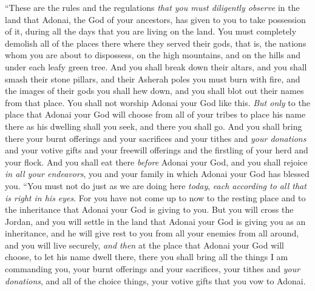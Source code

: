 \begin{biblechapter} %
 “These are the rules and the regulations \textit{that you must diligently observe} in the land that Adonai, the God of your ancestors, has given to you to take possession of it, during all the days that you are living on the land.
\verse You must completely demolish all of the places there where they served their gods, that is, the nations whom you are about to dispossess, on the high mountains, and on the hills and under each leafy green tree.
\verse And you shall break down their altars, and you shall smash their stone pillars, and their Asherah poles you must burn with fire, and the images of their gods you shall hew down, and you shall blot out their names from that place.
\verse You shall not worship Adonai your God like this.
\verse \textit{But only} to the place that Adonai your God will choose from all of your tribes to place his name there as his dwelling shall you seek, and there you shall go.
\verse And you shall bring there your burnt offerings and your sacrifices and your tithes and \textit{your donations} and your votive gifts and your freewill offerings and the firstling of your herd and your flock.
\verse And you shall eat there \textit{before} Adonai your God, and you shall rejoice \textit{in all your endeavors}, you and your family in which Adonai your God has blessed you.
\verse “You must not do just as we are doing here \textit{today}, \textit{each according to all that is right in his eyes}.
\verse For you have not come up to now to the resting place and to the inheritance that Adonai your God is giving to you.
\verse But you will cross the Jordan, and you will settle in the land that Adonai your God is giving you as an inheritance, and he will give rest to you from all your enemies from all around, and you will live securely,
\verse \textit{and then} at the place that Adonai your God will choose, to let his name dwell there, there you shall bring all the things I am commanding you, your burnt offerings and your sacrifices, your tithes and \textit{your donations}, and all of the choice things, your votive gifts that you vow to Adonai.

\end{biblechapter}
